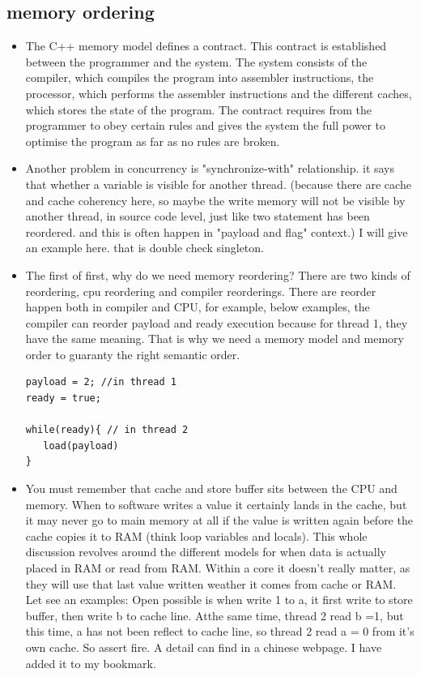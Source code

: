 \documentclass[a4paper,11pt,twoside]{book}
\begin{document}
\subsection{memory ordering}
\begin{itemize}
    \item The C++ memory model defines a contract. This contract is established between the programmer and the system. The system consists of the compiler, which compiles the program into assembler instructions, the processor, which performs the assembler instructions and the different caches, which stores the state of the program. The contract requires from the programmer to obey certain rules and gives the system the full power to optimise the program as far as no rules are broken. 
    
	\item Another problem in concurrency is "synchronize-with" relationship. it says that whether a variable is visible for another thread. (because there are cache and cache coherency here, so maybe the write memory will not be visible by another thread, in source code level, just like two statement has been reordered. and this is often happen in "payload and flag" context.) I will give an example here. that is double check singleton.

    \item The first of first, why do we need memory reordering? There are two kinds of reordering, cpu reordering and compiler reorderings. There are reorder happen both in compiler and CPU, for example, below examples, the compiler can reorder payload and ready execution because for thread 1, they have the same meaning. That is why we need a memory model and memory order to guaranty the right semantic order. 

\begin{lstlisting}
payload = 2; //in thread 1
ready = true;

while(ready){ // in thread 2
   load(payload)
}
\end{lstlisting}

	\item You must remember that cache and store buffer sits between the CPU and memory. When to software writes a value it certainly lands in the cache, but it may never go to main memory at all if the value is written again before the cache copies it to RAM (think loop variables and locals). This whole discussion revolves around the different models for when data is actually placed in RAM or read from RAM. Within a core it doesn't really matter, as they will use that last value written weather it comes from cache or RAM. Let see an examples: Open possible is when write 1 to a, it first write to store buffer, then write b to cache line. Atthe same time, thread 2 read b =1, but this time, a has not been reflect to cache line, so thread 2 read a = 0 from it's own cache. So assert fire. A detail can find in a chinese webpage. I have added it to my bookmark. 


\end{itemize}
\end{document}
